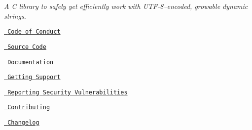 \label{index_md_README}%
%
 {\itshape A C library to safely yet efficiently work with UTF-\/8–encoded, growable dynamic strings.}


\begin{DoxyItemize}
\item \href{https://github.com/SFM61319/ds/blob/main/CODE_OF_CONDUCT.md}{\texttt{ Code of Conduct}}
\item \href{https://github.com/SFM61319/ds}{\texttt{ Source Code}}
\item \href{https://sfm61319.github.io/ds/}{\texttt{ Documentation}}
\item \href{https://github.com/SFM61319/ds/blob/main/SUPPORT.md}{\texttt{ Getting Support}}
\item \href{https://github.com/SFM61319/ds/blob/main/SECURITY.md}{\texttt{ Reporting Security Vulnerabilities}}
\item \href{https://github.com/SFM61319/ds/blob/main/CONTRIBUTING.md}{\texttt{ Contributing}}
\item \href{https://github.com/SFM61319/ds/blob/main/CHANGELOG.md}{\texttt{ Changelog}} 
\end{DoxyItemize}